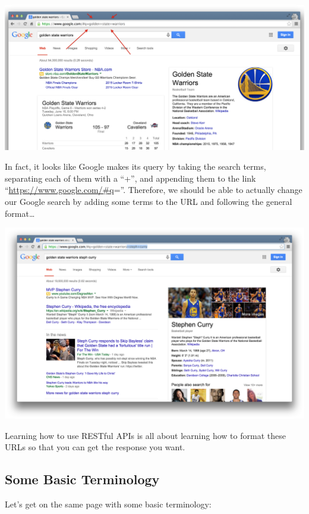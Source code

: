 \documentclass[]{book}
\begin{document}
\begin{center}\includegraphics[width=0.7\linewidth]{img/google_link} \end{center}

In fact, it looks like Google makes its query by taking the search
terms, separating each of them with a ``+'', and appending them to the
link ``\url{https://www.google.com/\#q}=''. Therefore, we should be able
to actually change our Google search by adding some terms to the URL and
following the general format\ldots{}

\begin{center}\includegraphics[width=0.7\linewidth]{img/google_link_change} \end{center}

Learning how to use RESTful APIs is all about learning how to format
these URLs so that you can get the response you want.

\subsection{Some Basic Terminology}\label{some-basic-terminology}

Let's get on the same page with some basic terminology:
\end{document}
